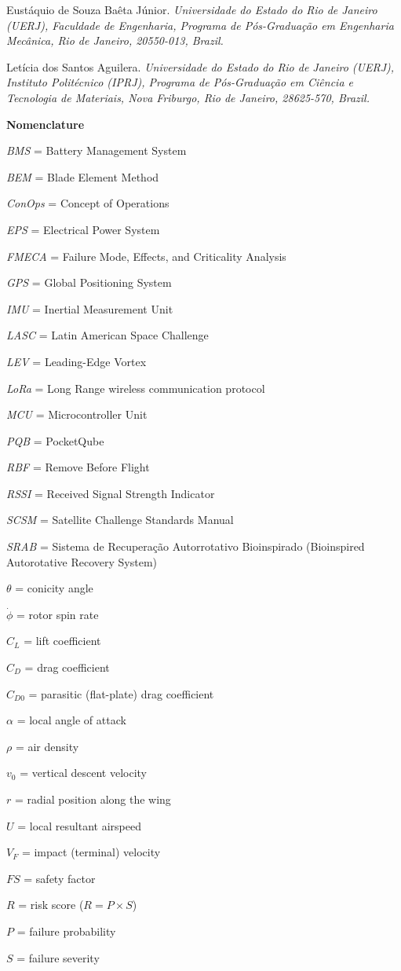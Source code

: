 Eustáquio de Souza Baêta Júnior. \emph{Universidade do Estado do Rio de
Janeiro (UERJ), Faculdade de Engenharia, Programa de Pós-Graduação em
Engenharia Mecânica, Rio de Janeiro, 20550-013, Brazil.}

Letícia dos Santos Aguilera. \emph{Universidade do Estado do Rio de Janeiro
(UERJ), Instituto Politécnico (IPRJ), Programa de Pós-Graduação em Ciência
e Tecnologia de Materiais, Nova Friburgo, Rio de Janeiro, 28625-570,
Brazil.}

\textbf{Nomenclature}

\emph{BMS} = Battery Management System

\emph{BEM} = Blade Element Method

\emph{ConOps} = Concept of Operations

\emph{EPS} = Electrical Power System

\emph{FMECA} = Failure Mode, Effects, and Criticality Analysis

\emph{GPS} = Global Positioning System

\emph{IMU} = Inertial Measurement Unit

\emph{LASC} = Latin American Space Challenge

\emph{LEV} = Leading-Edge Vortex

\emph{LoRa} = Long Range wireless communication protocol

\emph{MCU} = Microcontroller Unit

\emph{PQB} = PocketQube

\emph{RBF} = Remove Before Flight

\emph{RSSI} = Received Signal Strength Indicator

\emph{SCSM} = Satellite Challenge Standards Manual

\emph{SRAB} = Sistema de Recuperação Autorrotativo Bioinspirado
(Bioinspired Autorotative Recovery System)

\emph{$\theta$} = conicity angle

\emph{$\dot{\phi}$} = rotor spin rate

\emph{$C_L$} = lift coefficient

\emph{$C_D$} = drag coefficient

\emph{$C_{D0}$} = parasitic (flat-plate) drag coefficient

\emph{$\alpha$} = local angle of attack

\emph{$\rho$} = air density

\emph{$v_0$} = vertical descent velocity

\emph{$r$} = radial position along the wing

\emph{$U$} = local resultant airspeed

\emph{$V_F$} = impact (terminal) velocity

\emph{$FS$} = safety factor

\emph{$R$} = risk score ($R = P \times S$)

\emph{$P$} = failure probability

\emph{$S$} = failure severity
